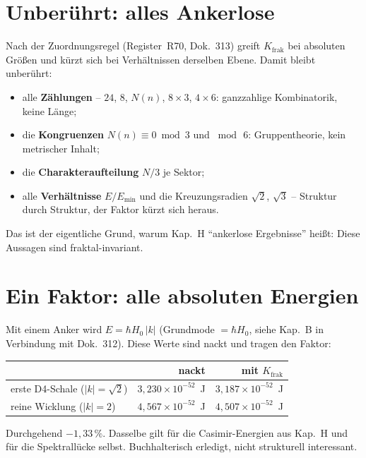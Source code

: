 \documentclass[11pt]{report}
\begin{document}
\section{Unberührt: alles Ankerlose}

Nach der Zuordnungsregel (Register~R70, Dok.~313) greift
$K_\text{frak}$ bei absoluten Größen und kürzt sich bei
Verhältnissen derselben Ebene. Damit bleibt unberührt:

\begin{itemize}
  \item alle \textbf{Zählungen} -- $24$, $8$, $N(n)$, $8\times3$,
        $4\times6$: ganzzahlige Kombinatorik, keine Länge;
  \item die \textbf{Kongruenzen} $N(n)\equiv0 \bmod 3$ und
        $\bmod\,6$: Gruppentheorie, kein metrischer Inhalt;
  \item die \textbf{Charakteraufteilung} $N/3$ je Sektor;
  \item alle \textbf{Verhältnisse} $E/E_\text{min}$ und die
        Kreuzungsradien $\sqrt2$, $\sqrt3$ -- Struktur durch
        Struktur, der Faktor kürzt sich heraus.
\end{itemize}

\noindent Das ist der eigentliche Grund, warum Kap.~H
\enquote{ankerlose Ergebnisse} heißt: Diese Aussagen sind
fraktal-invariant.

\section{Ein Faktor: alle absoluten Energien}

Mit einem Anker wird $E = \hbar H_0\,|k|$ (Grundmode $= \hbar H_0$,
siehe Kap.~B in Verbindung mit Dok.~312). Diese Werte sind nackt und
tragen den Faktor:

\begin{center}
\begin{tabular}{lrr}
\toprule
 & nackt & mit $K_\text{frak}$ \\
\midrule
erste D4-Schale ($|k| = \sqrt2$) & $3{,}230\times10^{-52}$~J &
  $3{,}187\times10^{-52}$~J \\
reine Wicklung ($|k| = 2$) & $4{,}567\times10^{-52}$~J &
  $4{,}507\times10^{-52}$~J \\
\bottomrule
\end{tabular}
\end{center}

\noindent Durchgehend $-1{,}33\,\%$. Dasselbe gilt für die
Casimir-Energien aus Kap.~H und für die Spektrallücke selbst.
Buchhalterisch erledigt, nicht strukturell interessant.
\end{document}
